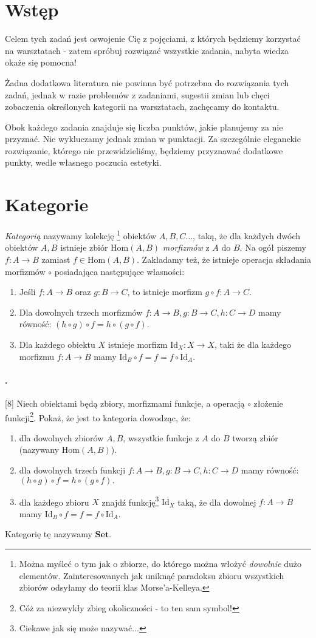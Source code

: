\documentclass{article}
\newcounter{itemnum}
\newenvironment{prob}
{\stepcounter{itemnum}
\paragraph*{\arabic{itemnum}.}}
{~\newline}
\newcommand{\Hom}{\text{Hom}}
\newcommand{\Id}{\text{Id}}
\newcommand{\Set}{\textbf{Set}}
\begin{document}
\section{Wstęp}
  Celem tych zadań jest oswojenie Cię z pojęciami, z których będziemy korzystać na warsztatach - zatem spróbuj rozwiązać wszystkie zadania, nabyta wiedza okaże się pomocna!

  Żadna dodatkowa literatura nie powinna być potrzebna do rozwiązania tych zadań, jednak w razie problemów z zadaniami, sugestii zmian lub chęci zobaczenia określonych kategorii na warsztatach, zachęcamy do kontaktu.

  Obok każdego zadania znajduje się liczba punktów, jakie planujemy za nie przyznać. Nie wykluczamy jednak zmian w punktacji. Za szczególnie eleganckie rozwiązanie, którego nie przewidzieliśmy, będziemy przyznawać dodatkowe punkty, wedle własnego poczucia estetyki.

\section{Kategorie}
\emph{Kategorią} nazywamy kolekcję
\footnote{Można myśleć o tym jak o zbiorze, do którego można włożyć \emph{dowolnie} dużo elementów. Zainteresowanych jak uniknąć paradoksu zbioru wszystkich zbiorów odsyłamy do teorii klas Morse'a-Kelleya.}
obiektów $A, B, C\dots$, taką, że dla każdych dwóch obiektów $A, B$ istnieje zbiór $\Hom(A, B)$ \textit{morfizmów} z $A$ do $B$. Na ogół piszemy $f:A\to B$ zamiast $f\in \Hom(A,B)$. Zakładamy też, że istnieje operacja składania morfizmów $\circ$ posiadająca następujące własności:
\begin{enumerate}
  \item Jeśli $f:A\to B$ oraz $g: B\to C$, to istnieje morfizm $g\circ f: A\to C$.
  \item Dla dowolnych trzech morfizmów $f:A\to B, g:B\to C, h:C\to D$ mamy równość: $(h\circ g)\circ f = h\circ(g\circ f).$
  \item Dla każdego obiektu $X$ istnieje morfizm $\Id_X: X\to X$, taki że dla każdego morfizmu $f:A\to B$ mamy $\Id_B\circ f=f=f\circ\Id_A$.
\end{enumerate}

\begin{prob}
  [8] Niech obiektami będą zbiory, morfizmami funkcje, a operacją $\circ$ złożenie funkcji\footnote{Cóż za niezwykły zbieg okoliczności - to ten sam symbol!}. Pokaż, że
  jest to kategoria dowodząc, że:
  \begin{enumerate}
    \item dla dowolnych zbiorów $A, B$, wszystkie funkcje z $A$ do $B$ tworzą zbiór (nazywany $\Hom(A,B)$).
    \item dla dowolnych trzech funkcji $f:A\to B, g:B\to C, h:C\to D$ mamy równość: $(h\circ g)\circ f = h\circ(g\circ f).$
    \item dla każdego zbioru $X$ znajdź funkcję\footnote{Ciekawe jak się może nazywać...} $\Id_X$ taką, że dla dowolnej $f:A\to B$ mamy $\Id_B\circ f=f=f\circ\Id_A$.
  \end{enumerate}
  Kategorię tę nazywamy $\Set$.
\end{prob}
\end{document}
